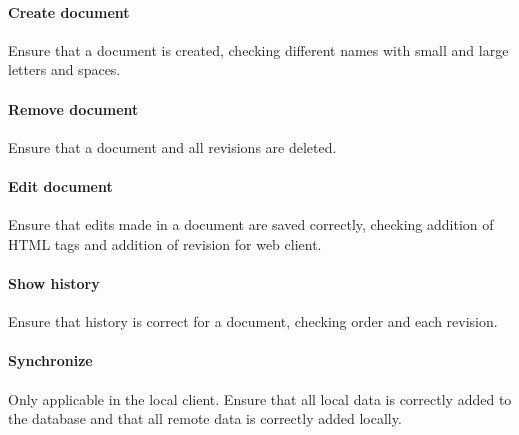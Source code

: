 	\paragraph{Create document}
	Ensure that a document is created, checking different names with small and large letters and spaces.

	\paragraph{Remove document}
	Ensure that a document and all revisions are deleted.

	\paragraph{Edit document}
	Ensure that edits made in a document are saved correctly, checking addition of HTML tags and addition of revision for web client.

	\paragraph{Show history}
	Ensure that history is correct for a document, checking order and each revision.

	\paragraph{Synchronize}
	Only applicable in the local client. Ensure that all local data is correctly added to the database and that all remote data is correctly added locally.